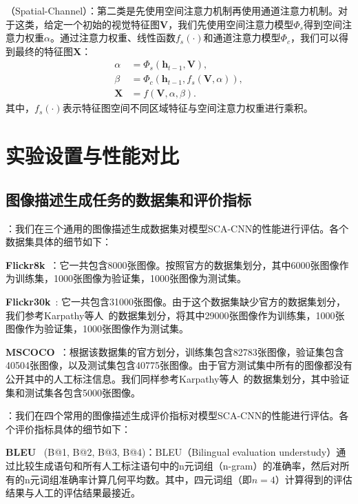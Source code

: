 \textbf{}（Spatial-Channel）：第二类是先使用空间注意力机制再使用通道注意力机制。对于这类，给定一个初始的视觉特征图$\bm{V}$，我们先使用空间注意力模型$\Phi_s$得到空间注意力权重$\alpha$。通过注意力权重、线性函数$f_s(\cdot)$和通道注意力模型$\Phi_c$，我们可以得到最终的特征图$\bm{X}$：
\begin{equation} \label{ch5:eq:eq_9}
\begin{split}
\alpha &= \Phi_s \left(\bm{h}_{t-1}, \bm{V} \right), \\
\beta &= \Phi_c \left(\bm{h}_{t-1}, f_s \left(\bm{V}, \alpha \right) \right), \\
\bm{X} &= f \left(\bm{V}, \alpha, \beta \right).
\end{split}
\end{equation}
其中，$f_s(\cdot)$表示特征图空间不同区域特征与空间注意力权重进行乘积。


\section{实验设置与性能对比}
\subsection{图像描述生成任务的数据集和评价指标}

\textbf{}：我们在三个通用的图像描述生成数据集对模型SCA-CNN的性能进行评估。各个数据集具体的细节如下：

\textbf{Flickr8k}~\cite{hodosh2013framing}：它一共包含8000张图像。按照官方的数据集划分，其中6000张图像作为训练集，1000张图像为验证集，1000张图像为测试集。

\textbf{Flickr30k}~\cite{young2014image}: 它一共包含31000张图像。由于这个数据集缺少官方的数据集划分，我们参考Karpathy等人~\cite{karpathy2015deep}的数据集划分，将其中29000张图像作为训练集，1000张图像作为验证集，1000张图像作为测试集。

\textbf{MSCOCO}~\cite{lin2014microsoft}：根据该数据集的官方划分，训练集包含82783张图像，验证集包含40504张图像，以及测试集包含40775张图像。由于官方测试集中所有的图像都没有公开其中的人工标注信息。我们同样参考Karpathy等人~\cite{karpathy2015deep}的数据集划分，其中验证集和测试集各包含5000张图像。

\textbf{}：我们在四个常用的图像描述生成评价指标对模型SCA-CNN的性能进行评估。各个评价指标具体的细节如下：

\textbf{BLEU}~\cite{papineni2002bleu} (B@1, B@2, B@3, B@4)：BLEU（Bilingual evaluation understudy）通过比较生成语句和所有人工标注语句中的n元词组（n-gram）的准确率，然后对所有的n元词组准确率计算几何平均数。其中，四元词组（即$n=4$）计算得到的评估结果与人工的评估结果最接近。

